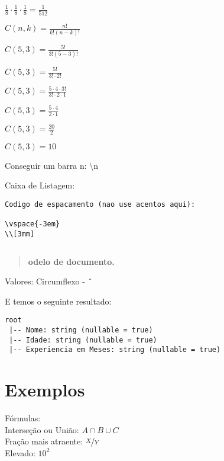 \documentclass[a4paper,11pt]{article}
\begin{document}
\maketitle %
\thispagestyle{fancy} %

$\frac{1}{8} \cdot \frac{1}{8} \cdot \frac{1}{8} = \frac{1}{512}$

$C(n, k) = \frac{n!}{k!(n - k)!}$

$C(5, 3) = \frac{5!}{3!(5 - 3)!}$

$C(5, 3) = \frac{5!}{3! \cdot 2!}$ 

$C(5, 3) = \frac{5 \cdot 4 \cdot 3!}{3! \cdot 2 \cdot 1}$

$C(5, 3) = \frac{5 \cdot 4}{2 \cdot 1}$

$C(5, 3) = \frac{20}{2}$

$C(5, 3) = 10$

Conseguir um barra n: $\setminus$n

Caixa de Listagem:
\begin{lstlisting}[]
Codigo de espacamento (nao use acentos aqui):

\vspace{-3em}
\\[3mm]
\end{lstlisting}

\begin{lstlisting}[]
\end{lstlisting}

\begin{abstract}
	\textbf{odelo de documento. \lipsum[4-1]}
\end{abstract}

Valores:
Circumflexo - $\string^$

E temos o seguinte resultado: \vspace{-1em}
\begin{verbatim}
root
 |-- Nome: string (nullable = true)
 |-- Idade: string (nullable = true)
 |-- Experiencia em Meses: string (nullable = true)
\end{verbatim}


\section{Exemplos}

Fórmulas: \\
Interseção ou União: $A \cap B \cup C$ \\
Fração mais atraente: $\nicefrac{X}{Y}$ \\
Elevado: $10^2$
\end{document}
